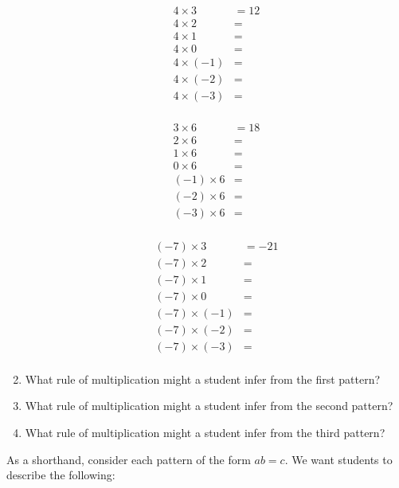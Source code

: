 \documentclass{ximera}
\begin{document}
\begin{problem}
\begin{enumerate}
\begin{center}
\begin{minipage}{0.3\textwidth}
\begin{align*}
4\times 3 &= 12 \\
4\times 2 &= \\
4\times 1 &= \\
4\times 0 &= \\
4\times (-1) &= \\
4\times (-2) &= \\
4\times (-3) &= \\
\end{align*}
\end{minipage}
\begin{minipage}{0.3\textwidth}
\begin{align*}
3\times 6 &= 18 \\
2\times 6 &= \\
1\times 6 &= \\
0\times 6 &= \\
(-1)\times 6 &= \\
(-2)\times 6 &= \\
(-3)\times 6 &= \\
\end{align*}
\end{minipage}
\begin{minipage}{0.3\textwidth}
\begin{align*}
(-7)\times 3 &= -21 \\
(-7)\times 2 &= \\
(-7)\times 1 &= \\
(-7)\times 0 &= \\
(-7)\times (-1) &= \\
(-7)\times (-2) &= \\
(-7)\times (-3) &= \\
\end{align*}
\end{minipage}
\end{center}
\item What rule of multiplication might a student infer from the first pattern? 
\item What rule of multiplication might a student infer from the second pattern?
\item What rule of multiplication might a student infer from the third pattern?
\end{enumerate}
\begin{teachingnote}
As a shorthand, consider each pattern of the form $ab = c$.  We want students to describe the following:  

\end{teachingnote}
\end{problem}
\end{document}
